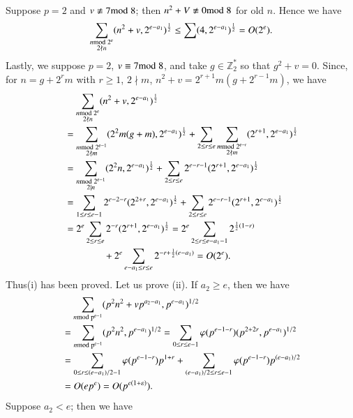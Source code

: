 Suppose $p=2$ and $v\not\equiv 7\rm{mod} \; 8$; then $n^{2}+V\not\equiv 0\rm{mod} \;
8$ for old $n$. Hence we have
$$
\sum_{\substack{n\rm{mod} \; 2^{e}\\ 2\nmid
    n}}(n^{2}+v,2^{e-a_{1}})^{\frac{1}{2}}\leq \sum(4,
2^{e-a_{1}})^{\frac{1}{2}}=O(2^{e}). 
$$
Lastly, we suppose $p=2$, $v\equiv 7\rm{mod} \; 8$, and take
$g\in\mathbb{Z}^{\ast}_{2}$ so that $g^{2}+v=0$. Since, for
$n=g+2^{r}m$ with $r\geq 1$, $2\nmid m$,
$n^{2}+v=2^{r+1}m(g+2^{r-1}m)$, we have
\begin{align*}
&\quad  \sum_{\substack{n\rm{mod} \; 2^{e}\\ 2\nmid n}}(n^{2}+v,
  2^{e-a_{1}})^{\frac{1}{2}}\\
&=\sum_{\substack{m\rm{mod} \; 2^{e-1}\\ 2\nmid m}}(2^{2}m(g+m),
  2^{e-a_{1}})^{\frac{1}{2}}+\sum_{2\leq r\leq e}\sum_{\substack{m\rm{mod} \;
  2^{e-r}\\ 2\nmid m}}(2^{r+1},2^{e-a_{1}})^{\frac{1}{2}}\\
&= \sum_{\substack{n\rm{mod} \; 2^{e-1}\\ 2|n}}(2^{2}n,
  2^{e-a_{1}})^{\frac{1}{2}} +\sum_{2\leq r\leq e}2^{e-r-1}(2^{r+1},
  2^{e-a_{1}})^{\frac{1}{2}}\\
&= \sum_{1\leq r\leq
    e-1}2^{e-2-r}(2^{2+r},2^{e-a_{1}})^{\frac{1}{2}}+\sum_{2\leq r\leq
    e}2^{e-r-1}(2^{r+1}, 2^{e-a_{1}})^{\frac{1}{2}}\\
&= 2^{e}\sum_{2\leq r\leq e}2^{-r}(2^{r+1},
  2^{e-a_{1}})^{\frac{1}{2}}=2^{e}\sum_{2\leq r\leq
    e-a_{1}-1}2^{\frac{1}{2}(1-r)}\\
&\qquad\qquad +2^{e}\sum_{e-a_{1}\leq r\leq e}2^{-r+\frac{1}{2}(e-a_{1})}=O(2^{e}).
\end{align*}
Thus\pageoriginale (i) has been proved. Let us prove (ii). If
$a_{2}\geq e$, then we have
\begin{align*}
&\quad \sum_{n\rm{mod} \; p^{e-1}}(p^{2}n^{2}+vp^{a_{2}-a_{1}},
  p^{e-a_{1}})^{1/2}\\
&= \sum_{n\rm{mod} \; p^{e-1}}(p^{2}n^{2},p^{e-a_{1}})^{1/2}=\sum_{0\leq
    r\leq e-1}\varphi(p^{e-1-r})(p^{2+2r}, p^{e-a_{1}})^{1/2}\\
&= \sum_{0\leq r\leq
    (e-a_{1})/2-1}\varphi(p^{e-1-r})p^{1+r}+\sum_{(e-a_{1})/2\leq
    r\leq e-1}\varphi(p^{e-1-r})p^{(e-a_{1})/2}\\
&=O(ep^{e})=O(p^{e(1+\varepsilon)}).
\end{align*}
Suppose $a_{2}<e$; then we have
